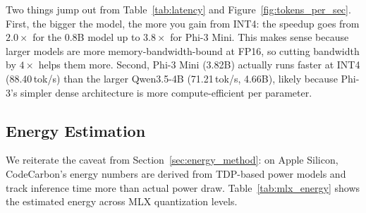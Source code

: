 \documentclass[journal]{IEEEtran}
\begin{document}
Two things jump out from Table~\ref{tab:latency} and Figure~\ref{fig:tokens_per_sec}. First, the bigger the model, the more you gain from INT4: the speedup goes from $2.0\times$ for the 0.8B model up to $3.8\times$ for Phi-3 Mini. This makes sense because larger models are more memory-bandwidth-bound at FP16, so cutting bandwidth by $4\times$ helps them more. Second, Phi-3 Mini (3.82B) actually runs faster at INT4 (88.40\,tok/s) than the larger Qwen3.5-4B (71.21\,tok/s, 4.66B), likely because Phi-3's simpler dense architecture is more compute-efficient per parameter.

\subsection{Energy Estimation}

We reiterate the caveat from Section~\ref{sec:energy_method}: on Apple Silicon, CodeCarbon's energy numbers are derived from TDP-based power models and track inference time more than actual power draw. Table~\ref{tab:mlx_energy} shows the estimated energy across MLX quantization levels.

\begin{table}[htbp]
\centering
\caption{MLX estimated energy across quantization levels (100 tokens). Energy values are CodeCarbon estimates based on TDP models, not direct measurements.}
\label{tab:mlx_energy}
\end{table}
\end{document}
